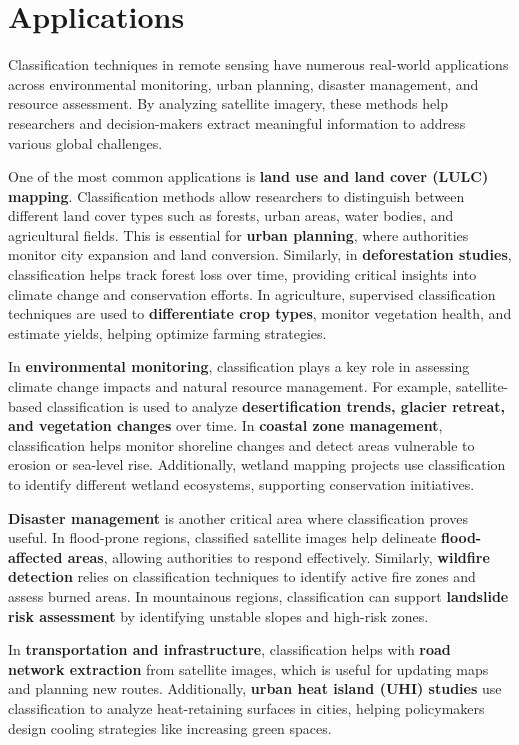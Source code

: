 \documentclass[
  letterpaper,
]{scrbook}
\begin{document}
\section{Applications}\label{applications-4}

Classification techniques in remote sensing have numerous real-world
applications across environmental monitoring, urban planning, disaster
management, and resource assessment. By analyzing satellite imagery,
these methods help researchers and decision-makers extract meaningful
information to address various global challenges.

One of the most common applications is \textbf{land use and land cover
(LULC) mapping}. Classification methods allow researchers to distinguish
between different land cover types such as forests, urban areas, water
bodies, and agricultural fields. This is essential for \textbf{urban
planning}, where authorities monitor city expansion and land conversion.
Similarly, in \textbf{deforestation studies}, classification helps track
forest loss over time, providing critical insights into climate change
and conservation efforts. In agriculture, supervised classification
techniques are used to \textbf{differentiate crop types}, monitor
vegetation health, and estimate yields, helping optimize farming
strategies.

In \textbf{environmental monitoring}, classification plays a key role in
assessing climate change impacts and natural resource management. For
example, satellite-based classification is used to analyze
\textbf{desertification trends, glacier retreat, and vegetation changes}
over time. In \textbf{coastal zone management}, classification helps
monitor shoreline changes and detect areas vulnerable to erosion or
sea-level rise. Additionally, wetland mapping projects use
classification to identify different wetland ecosystems, supporting
conservation initiatives.

\textbf{Disaster management} is another critical area where
classification proves useful. In flood-prone regions, classified
satellite images help delineate \textbf{flood-affected areas}, allowing
authorities to respond effectively. Similarly, \textbf{wildfire
detection} relies on classification techniques to identify active fire
zones and assess burned areas. In mountainous regions, classification
can support \textbf{landslide risk assessment} by identifying unstable
slopes and high-risk zones.

In \textbf{transportation and infrastructure}, classification helps with
\textbf{road network extraction} from satellite images, which is useful
for updating maps and planning new routes. Additionally, \textbf{urban
heat island (UHI) studies} use classification to analyze heat-retaining
surfaces in cities, helping policymakers design cooling strategies like
increasing green spaces.
\end{document}
